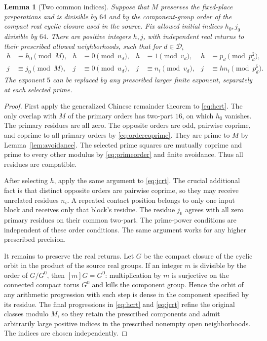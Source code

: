 \documentclass[11pt]{article}
\newtheorem{lemma}[theorem]{Lemma}
\begin{document}
\begin{lemma}[Two common indices]\label{lem:indices}
Suppose that \(M\) preserves the fixed-place preparations and
is divisible by \(64\) and by the component-group order of the
compact real cyclic closure used in the source. Fix allowed
initial indices \(h_0,j_0\) divisible by \(64\).
There are positive integers \(h,j\), with independent real
returns to their prescribed allowed neighborhoods, such that
for \(d\in\mathcal D_i\)
\begin{align}
 h&\equiv h_0\pmod M,& h&\equiv0\pmod {u_d},&
 h&\equiv1\pmod {v_d},&
 h&\equiv p_d\pmod {p_d^2},\label{eq:hcrt}\\
 j&\equiv j_0\pmod M,& j&\equiv0\pmod {u_d},&
 j&\equiv n_i\pmod {v_d},&
 j&\equiv hn_i\pmod {p_d^5}.\label{eq:jcrt}
\end{align}
The exponent \(5\) can be replaced by any prescribed larger
finite exponent, separately at each selected prime.
\end{lemma}
\begin{proof}
First apply the generalized Chinese remainder theorem to
\eqref{eq:hcrt}. The only overlap with \(M\) of the primary
orders has two-part \(16\), on which \(h_0\) vanishes. The
primary residues are all zero. The opposite orders are odd,
pairwise coprime, and coprime to all primary orders by
\eqref{eq:ordercoprime}. They are prime to \(M\) by
Lemma~\ref{lem:avoidance}. The selected prime squares are
mutually coprime and prime to every other modulus by
\eqref{eq:primeorder} and finite avoidance. Thus all residues
are compatible.

After selecting \(h\), apply the same argument to
\eqref{eq:jcrt}. The crucial additional fact is that distinct
opposite orders are pairwise coprime, so they may receive
unrelated residues \(n_i\). A repeated contact position belongs
to only one input block and receives only that block's residue.
The residue \(j_0\) agrees with all zero primary residues on
their common two-part. The prime-power conditions are independent
of these order conditions. The same argument works for any
higher prescribed precision.

It remains to preserve the real returns. Let \(G\) be the compact
closure of the cyclic orbit in the product of the source real
groups. If an integer \(m\) is divisible by the order of
\(G/G^0\), then \([m]G=G^0\): multiplication by \(m\) is
surjective on the connected compact torus \(G^0\) and kills
the component group. Hence the orbit of any arithmetic
progression with such step is dense in the component specified
by its residue. The final progressions in \eqref{eq:hcrt} and
\eqref{eq:jcrt} refine the original classes modulo \(M\), so
they retain the prescribed components and admit arbitrarily
large positive indices in the prescribed nonempty open
neighborhoods. The indices are chosen independently.
\end{proof}
\end{document}
